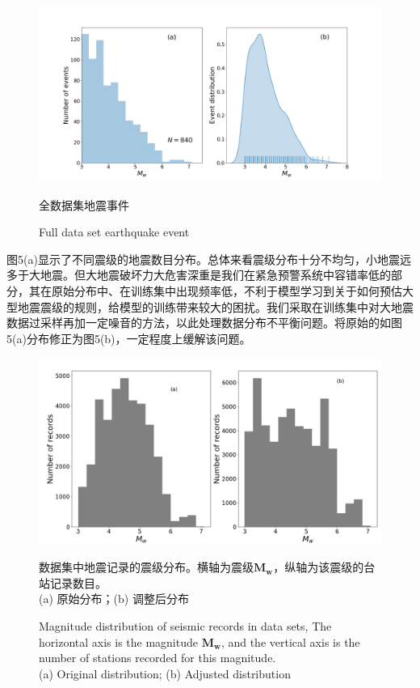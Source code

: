 \begin{figure}[!h] 
\centering 
 \includegraphics[width=0.95\linewidth]{img/Event distribution.png} 
 \renewcommand{\figurename}{图} 
\caption{全数据集地震事件} 
\addtocounter{figure}{-1} \vspace{-5pt} 
\renewcommand{\figurename}{Fig} 
\caption{Full data set earthquake event} 
\renewcommand{\figurename}{图} 
\label{fig:network-device-influence.png} 
\end{figure}
\indent 图5(a)显示了不同震级的地震数目分布。总体来看震级分布十分不均匀，小地震远多于大地震。但大地震破坏力大危害深重是我们在紧急预警系统中容错率低的部分，其在原始分布中、在训练集中出现频率低，不利于模型学习到关于如何预估大型地震震级的规则，给模型的训练带来较大的困扰。我们采取在训练集中对大地震数据过采样再加一定噪音的方法，以此处理数据分布不平衡问题。将原始的如图5(a)分布修正为图5(b)，一定程度上缓解该问题。\\
\begin{figure}[!h] 
\centering 
 \includegraphics[width=0.95\linewidth]{img/event_dist.png} 
 \renewcommand{\figurename}{图} 
\caption{数据集中地震记录的震级分布。横轴为震级$\mathbf{M}_{\mathbf{w}}$，纵轴为该震级的台站记录数目。\\
(a) 原始分布；(b) 调整后分布} 
\addtocounter{figure}{-1} \vspace{-5pt} 
\renewcommand{\figurename}{Fig} 
\caption{Magnitude distribution of seismic records in data sets, The horizontal axis is the magnitude $\mathbf{M}_{\mathbf{w}}$, and the vertical axis is the number of stations recorded for this magnitude.\\
(a) Original distribution; (b) Adjusted distribution
} 
\renewcommand{\figurename}{图} 
\label{fig:network-device-influence.png} 
\end{figure}


